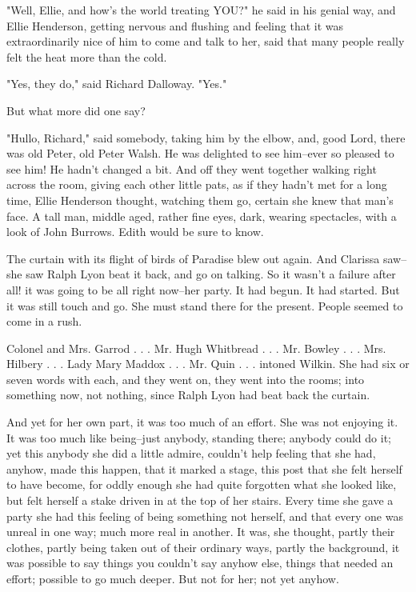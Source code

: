 \documentclass[lang=cn,10pt]{elegantbook}
\begin{document}
"Well, Ellie, and how's the world treating YOU?" he said in his
genial way, and Ellie Henderson, getting nervous and flushing and
feeling that it was extraordinarily nice of him to come and talk to
her, said that many people really felt the heat more than the cold.

"Yes, they do," said Richard Dalloway.  "Yes."

But what more did one say?

"Hullo, Richard," said somebody, taking him by the elbow, and, good
Lord, there was old Peter, old Peter Walsh.  He was delighted to
see him--ever so pleased to see him!  He hadn't changed a bit.  And
off they went together walking right across the room, giving each
other little pats, as if they hadn't met for a long time, Ellie
Henderson thought, watching them go, certain she knew that man's
face.  A tall man, middle aged, rather fine eyes, dark, wearing
spectacles, with a look of John Burrows.  Edith would be sure to
know.

The curtain with its flight of birds of Paradise blew out again.
And Clarissa saw--she saw Ralph Lyon beat it back, and go on
talking.  So it wasn't a failure after all! it was going to be all
right now--her party.  It had begun.  It had started.  But it was
still touch and go.  She must stand there for the present.  People
seemed to come in a rush.

Colonel and Mrs. Garrod . . . Mr. Hugh Whitbread . . . Mr. Bowley
. . . Mrs. Hilbery . . . Lady Mary Maddox . . . Mr. Quin . . .
intoned Wilkin.  She had six or seven words with each, and they
went on, they went into the rooms; into something now, not nothing,
since Ralph Lyon had beat back the curtain.

And yet for her own part, it was too much of an effort.  She was
not enjoying it.  It was too much like being--just anybody,
standing there; anybody could do it; yet this anybody she did a
little admire, couldn't help feeling that she had, anyhow, made
this happen, that it marked a stage, this post that she felt
herself to have become, for oddly enough she had quite forgotten
what she looked like, but felt herself a stake driven in at the top
of her stairs.  Every time she gave a party she had this feeling of
being something not herself, and that every one was unreal in one
way; much more real in another.  It was, she thought, partly their
clothes, partly being taken out of their ordinary ways, partly the
background, it was possible to say things you couldn't say anyhow
else, things that needed an effort; possible to go much deeper.
But not for her; not yet anyhow.
\end{document}
